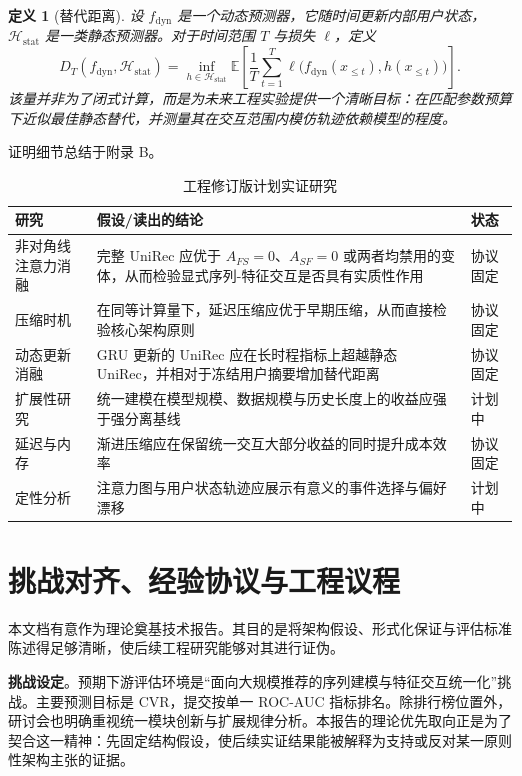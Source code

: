 \documentclass{article}
\newtheorem{definition}{定义}
\begin{document}
\begin{definition}[替代距离]
设 \(f_{\mathrm{dyn}}\) 是一个动态预测器，它随时间更新内部用户状态，\(\mathcal{H}_{\mathrm{stat}}\) 是一类静态预测器。对于时间范围 \(T\) 与损失 \(\ell\)，定义
\[
D_T(f_{\mathrm{dyn}}, \mathcal{H}_{\mathrm{stat}}) = \inf_{h \in \mathcal{H}_{\mathrm{stat}}} \mathbb{E}\left[ \frac{1}{T} \sum_{t=1}^{T} \ell\bigl(f_{\mathrm{dyn}}(x_{\le t}), h(x_{\le t})\bigr) \right]. \tag{6.3}
\]
该量并非为了闭式计算，而是为未来工程实验提供一个清晰目标：在匹配参数预算下近似最佳静态替代，并测量其在交互范围内模仿轨迹依赖模型的程度。
\end{definition}

证明细节总结于附录 B。

\begin{table}[htbp]
\centering
\caption{工程修订版计划实证研究}
\label{tab:studies}
\begin{tabular}{lp{8cm}l}
\toprule
\textbf{研究} & \textbf{假设/读出的结论} & \textbf{状态} \\
\midrule
非对角线注意力消融 & 完整 UniRec 应优于 \(A_{FS}=0\)、\(A_{SF}=0\) 或两者均禁用的变体，从而检验显式序列-特征交互是否具有实质性作用 & 协议固定 \\
压缩时机 & 在同等计算量下，延迟压缩应优于早期压缩，从而直接检验核心架构原则 & 协议固定 \\
动态更新消融 & GRU 更新的 UniRec 应在长时程指标上超越静态 UniRec，并相对于冻结用户摘要增加替代距离 & 协议固定 \\
扩展性研究 & 统一建模在模型规模、数据规模与历史长度上的收益应强于强分离基线 & 计划中 \\
延迟与内存 & 渐进压缩应在保留统一交互大部分收益的同时提升成本效率 & 协议固定 \\
定性分析 & 注意力图与用户状态轨迹应展示有意义的事件选择与偏好漂移 & 计划中 \\
\bottomrule
\end{tabular}
\end{table}

\section{挑战对齐、经验协议与工程议程}

本文档有意作为理论奠基技术报告。其目的是将架构假设、形式化保证与评估标准陈述得足够清晰，使后续工程研究能够对其进行证伪。

\textbf{挑战设定}。预期下游评估环境是“面向大规模推荐的序列建模与特征交互统一化”挑战。主要预测目标是 CVR，提交按单一 ROC-AUC 指标排名。除排行榜位置外，研讨会也明确重视统一模块创新与扩展规律分析。本报告的理论优先取向正是为了契合这一精神：先固定结构假设，使后续实证结果能被解释为支持或反对某一原则性架构主张的证据。
\end{document}
